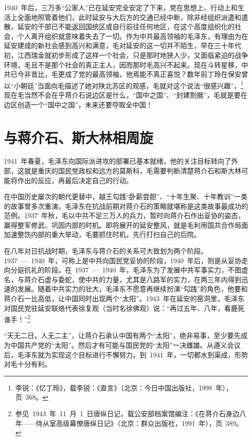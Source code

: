 1940~年后，三万多“公家人”已在延安完全安定了下来，党在思想上、行动上和生活上全面地照管着他们，此时延安与大后方的交通已经中断，除非经组织派遣和遣散，延安的干部已不能返回国统区或自行前往任何地区，在这个高度组织化的社会，个人离开组织就意味着失去了一切。作为中共最高领袖的毛泽东，有理由为在延安建成的新社会感到高兴和满意，毛对延安的这一切并不陌生，早在三十年代初，江西瑞金就初步形成了这样一个社会，只是那时地狭人少，又面临紧迫的战争环境，毛且不是那个社会的真正主人，因而那时毛高兴不起来。现在斗转星移，中共已今非昔比，毛更成了党的最高领袖，他焉能不真正喜悦？数年前丁玲在保安曾以“小朝廷”当面向毛描述了她对陕北苏区的观感，毛就对这个说法“很感兴趣”，\footnote{李锐：《忆丁玲》，载李锐：《直言》（北京：今日中国出版社，1998~年），页~368。}现在毛当然不会在乎蒋介石说边区是什么，“国中之国”、“封建割据”，毛就是要在边区创造一个“国中之国”，未来还要夺取全中国！

\section{与蒋介石、斯大林相周旋}

1941~年春夏，毛泽东向国际派进攻的部署已基本就绪，他的关注目标转向了外部，这就是重庆的国民党政权和远方的莫斯科，毛需要判断清楚蒋介石和斯大林可能将作出的反应，再最后决定自己的行动。

在中国历史屡次的朝代更替中，越王勾践“卧薪尝胆”、“十年生聚、十年教训”一类的故事曾多次重演，毛泽东在抗战前期对蒋介石的策略就堪称是这类故事最成功的范例。1937~年秋，毛以中共不足三万人的兵力，暂时向蒋介石作出妥协的姿态，赢得整军修武、巩固内部的时机。即将展开的延安整风，就是毛利用国共合作局面加速整饬内部的重大举动，毛要抓住时机，先行打扫自己的后院。

在八年对日抗战时期，毛泽东与蒋介石的关系可大致划为两个阶段。1937~—~1940~年，可称上是中共向国民党妥协的阶段，1940~年后，则是从妥协走向分庭抗礼的阶段。在~1937~—~1940~年，毛泽东为了发展中共军事实力，不图虚名，与蒋介石虚与委蛇，使中共的力量，尤其是八路军的实力，在两三年内得到迅速的发展。随着中共实力的壮大，毛泽东不愿意再继续扮演“勾践”的角色，他要和蒋介石一比高低，让中国同时出现两个“太阳”。1943~年在延安的窑洞里，毛泽东对国民党驻延安联络代表徐复观（当时名徐佛观）说：“再过五年、八年，看鹿死谁手！”\footnote{参见~1943~年~11~月~1~日唐纵日记，载公安部档案馆编注：《在蒋介石身边八年——侍从室高级幕僚唐纵日记》（北京：群众出版社，1991~年），页~389。}

“天无二日，人无二主”，让蒋介石承认中国有两个“太阳”，绝非易事，至少要先成为中国共产党的“太阳”。然后才有可能与国民党的“太阳”一决雌雄。从遵义会议后，毛泽东就为实现这个目标进行不懈努力。到~1941~年，一切都水到渠成，形势对毛十分有利。

